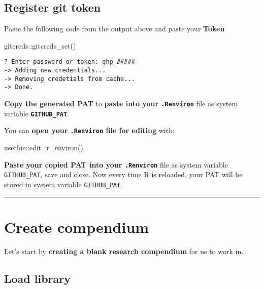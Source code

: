 \documentclass[
  letterpaper,
  DIV=11,
  numbers=noendperiod]{scrreprt}
\newenvironment{Shaded}{\begin{snugshade}}{\end{snugshade}}
\newcommand{\FunctionTok}[1]{\textcolor[rgb]{0.28,0.35,0.67}{#1}}
\newcommand{\NormalTok}[1]{\textcolor[rgb]{0.00,0.23,0.31}{#1}}
\newcommand{\SpecialCharTok}[1]{\textcolor[rgb]{0.37,0.37,0.37}{#1}}
\begin{document}
\hypertarget{register-git-token}{%
\subsection{\texorpdfstring{\textbf{Register git
token}}{Register git token}}\label{register-git-token}}

Paste the following code from the output above and paste your
\textbf{Token}

\begin{Shaded}
\begin{Highlighting}[]
\NormalTok{gitcreds}\SpecialCharTok{::}\FunctionTok{gitcreds\_set}\NormalTok{()}
\end{Highlighting}
\end{Shaded}

\begin{verbatim}
? Enter password or token: ghp_#####
-> Adding new credentials...
-> Removing credetials from cache...
-> Done.
\end{verbatim}

\textbf{Copy the generated PAT} to \textbf{paste into your
\texttt{.Renviron}} file as system variable
\textbf{\texttt{GITHUB\_PAT}}.

You can \textbf{open your \texttt{.Renviron} file for editing} with:

\begin{Shaded}
\begin{Highlighting}[]
\NormalTok{usethis}\SpecialCharTok{::}\FunctionTok{edit\_r\_environ}\NormalTok{()}
\end{Highlighting}
\end{Shaded}

\textbf{Paste your copied PAT into your \texttt{.Renviron}} file as
system variable \texttt{GITHUB\_PAT}, save and close. Now every time R
is reloaded, your PAT will be stored in system variable
\texttt{GITHUB\_PAT}.

\begin{center}\rule{0.5\linewidth}{0.5pt}\end{center}

\hypertarget{create-compendium}{%
\section{Create compendium}\label{create-compendium}}

Let's start by \textbf{creating a blank research compendium} for us to
work in.

\hypertarget{load-library}{%
\subsection{Load library}\label{load-library}}
\end{document}

